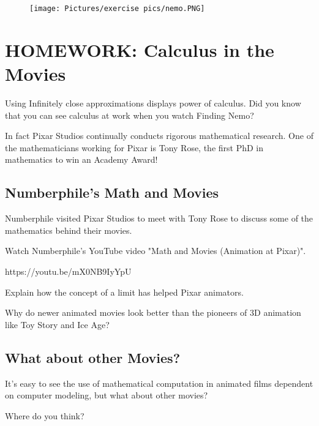 
\begin{figure}[h]
    \centering
    \texttt{[image: Pictures/exercise pics/nemo.PNG]}
    \label{fig:nemo}
\end{figure}

\section{HOMEWORK: Calculus in the Movies}

Using Infinitely close approximations displays power of calculus. Did you know that you can see calculus at work when you watch Finding Nemo?

\noindent In fact Pixar Studios continually conducts rigorous mathematical research. One of the mathematicians working for Pixar is Tony Rose, the first PhD in mathematics to win an Academy Award!

\subsection{Numberphile's Math and Movies}

Numberphile visited Pixar Studios to meet with Tony Rose to discuss some of the mathematics behind their movies.

\begin{exercise}
Watch Numberphile’s YouTube video "Math and Movies (Animation at Pixar)"\cite{numberphile_movies}. 
\end{exercise}
{\footnotesize https://youtu.be/mX0NB9IyYpU }

\begin{exercise}
Explain how the concept of a limit has helped Pixar animators.
\end{exercise}

\blanks
\blanks

\begin{exercise}
Why do newer animated movies look better than the pioneers of 3D animation like Toy Story and Ice Age?
\end{exercise}

\blanks
\blanks

\subsection{What about other Movies?}

It's easy to see the use of mathematical computation in animated films dependent on computer modeling, but what about other movies?

\begin{exercise}
Where do you think?
\end{exercise}

\blanks
\blanks



